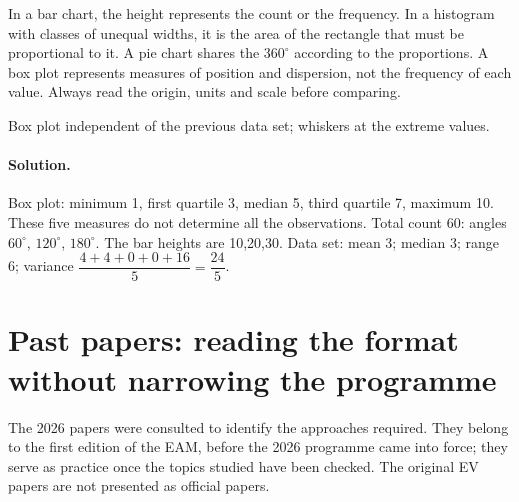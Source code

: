 In a bar chart, the height represents the count or the frequency. In a histogram with classes of unequal widths, it is the area of the rectangle that must be proportional to it. A pie chart shares the $360^\circ$ according to the proportions. A box plot represents measures of position and dispersion, not the frequency of each value. Always read the origin, units and scale before comparing.
\label{STATS-EX}
\begin{center}\par\small Box plot independent of the previous data set; whiskers at the extreme values.\end{center}
\ifprof
\paragraph{Solution.} Box plot: minimum 1, first quartile 3, median 5, third quartile 7, maximum 10. These five measures do not determine all the observations. Total count 60: angles $60^\circ$, $120^\circ$, $180^\circ$. The bar heights are 10,20,30. Data set: mean 3; median 3; range 6; variance $\dfrac{4+4+0+0+16}{5}=\dfrac{24}{5}$.
\fi

\section{Past papers: reading the format without narrowing the programme}\label{ANNALES}
The 2026 papers were consulted to identify the approaches required. They belong to the first edition of the EAM, before the 2026 programme came into force; they serve as practice once the topics studied have been checked. The original EV papers are not presented as official papers.

